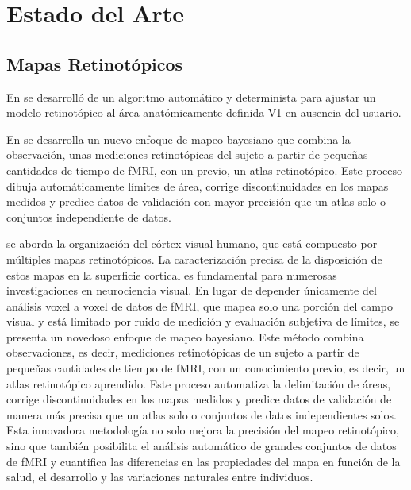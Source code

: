 \chapter{Estado del Arte}\label{chapter:state-of-the-art}


\section*{Mapas Retinot\'opicos}

En \cite{benson_retinotopic_2012} se desarroll\'o de un algoritmo automático y determinista para ajustar un modelo retinotópico al área anatómicamente definida V1 en ausencia del usuario.

En \cite{benson_bayesian_2018} se desarrolla un nuevo enfoque de mapeo bayesiano que combina la observación, unas
mediciones retinotópicas del sujeto a partir de pequeñas cantidades de tiempo de fMRI, con un previo, un 
atlas retinotópico. Este proceso dibuja automáticamente límites de área, corrige discontinuidades en los
mapas medidos y predice datos de validación con mayor precisión que un atlas solo o conjuntos independiente
de datos.

se aborda la organización del córtex visual humano, que está compuesto por múltiples mapas retinotópicos. La caracterización precisa de la disposición de estos mapas en la superficie cortical es fundamental para numerosas investigaciones en neurociencia visual. En lugar de depender únicamente del análisis voxel a voxel de datos de fMRI, que mapea solo una porción del campo visual y está limitado por ruido de medición y evaluación subjetiva de límites, se presenta un novedoso enfoque de mapeo bayesiano. Este método combina observaciones, es decir, mediciones retinotópicas de un sujeto a partir de pequeñas cantidades de tiempo de fMRI, con un conocimiento previo, es decir, un atlas retinotópico aprendido. Este proceso automatiza la delimitación de áreas, corrige discontinuidades en los mapas medidos y predice datos de validación de manera más precisa que un atlas solo o conjuntos de datos independientes solos. Esta innovadora metodología no solo mejora la precisión del mapeo retinotópico, sino que también posibilita el análisis automático de grandes conjuntos de datos de fMRI y cuantifica las diferencias en las propiedades del mapa en función de la salud, el desarrollo y las variaciones naturales entre individuos.

